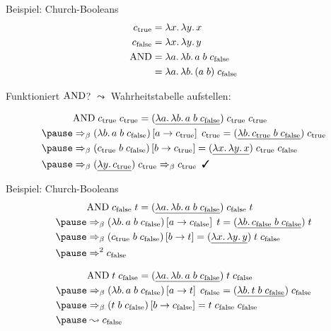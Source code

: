 \documentclass{beamer}
\begin{document}
\begin{frame}{Beispiel: Church-Booleans}
  \begin{eqnarray*}
    c_\text{true} &= \lambda x.\, \lambda y.\, x \\
    c_\text{false} &= \lambda x.\, \lambda y.\, y \\
    \text{AND} &= \lambda a.\, \lambda b.\, a\;b\;c_\text{false} \\
          &= \lambda a.\, \lambda b.\, (a\;b)\;c_\text{false} \\
  \end{eqnarray*}

  Funktioniert $\text{AND}$? $\leadsto$ Wahrheitstabelle aufstellen:

  \begin{eqnarray*}
    &\app{\app{\cand}{\ctrue}}{\ctrue} = \app{\app{(\uline{\lam{a}{\lam{b}{\app{\app{a}{b}}{\cfalse}}}})}{\ctrue}}{\ctrue} \\
    \pause
    &\Rightarrow_\beta \app{(\lam{b}{\app{\app{a}{b}}{\cfalse}})\left[ a \to \ctrue \right]}{\ctrue} = \app{(\uline{\lam{b}{\app{\app{\ctrue}{b}}{\cfalse}}})}{\ctrue} \\
    \pause
    &\Rightarrow_\beta (\app{\app{\ctrue}{b}}{\cfalse}) \left[ b \to \ctrue \right] = \app{\app{(\uline{\lam{x}{\lam{y}{x}}})}{\ctrue}}{\cfalse} \\
    \pause
    &\Rightarrow_\beta \app{(\uline{\lam{y}{\ctrue}})}{\ctrue} \Rightarrow_\beta \ctrue \;\; \text{\true}
  \end{eqnarray*}
\end{frame}

\begin{frame}{Beispiel: Church-Booleans}
  \begin{eqnarray*}
    &\app{\app{\cand}{\cfalse}}{t} = \app{\app{(\uline{\lam{a}{\lam{b}{\app{\app{a}{b}}{\cfalse}}}})}{\cfalse}}{t} \\
    \pause
    &\Rightarrow_\beta \app{(\lam{b}{\app{\app{a}{b}}{\cfalse}})\left[ a \to \cfalse \right]}{t} = \app{(\uline{\lam{b}{\app{\app{\cfalse}{b}}{\cfalse}}})}{t} \\
    \pause
    &\Rightarrow_\beta (\app{\app{\ctrue}{b}}{\cfalse}) \left[ b \to t \right] = \app{\app{(\uline{\lam{x}{\lam{y}{y}}})}{t}}{\cfalse} \\
    \pause
    &\Rightarrow^2 \cfalse
  \end{eqnarray*}

  \begin{eqnarray*}
    &\app{\app{\cand}{t}}{\cfalse} = \app{\app{(\uline{\lam{a}{\lam{b}{\app{\app{a}{b}}{\cfalse}}}})}{t}}{\cfalse} \\
    \pause
    &\Rightarrow_\beta \app{(\lam{b}{\app{\app{a}{b}}{\cfalse}})\left[ a \to t \right]}{\cfalse} = \app{(\uline{\lam{b}{\app{\app{t}{b}}{\cfalse}}})}{\cfalse} \\
    \pause
    &\Rightarrow_\beta (\app{\app{t}{b}}{\cfalse}) \left[ b \to \cfalse \right] = \app{\app{t}{\cfalse}}{\cfalse} \\
    \pause
    &\leadsto \cfalse
  \end{eqnarray*}
\end{frame}
\end{document}
